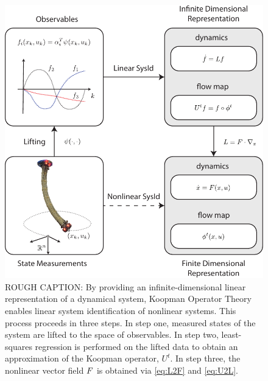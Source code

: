 \begin{figure}[t]
    \centering
    \includegraphics[width=\linewidth]{figures/overviewDiagram_v14.pdf}
    \caption{ROUGH CAPTION: 
    By providing an infinite-dimensional linear representation of a dynamical system, Koopman Operator Theory enables linear system identification of nonlinear systems. 
    This process proceeds in three steps.
    In step one, measured states of the system are lifted to the space of observables.
    In step two, least-squares regression is performed on the lifted data to obtain an approximation of the Koopman operator, $U^t$.
    In step three, the nonlinear vector field $F$ is obtained via \eqref{eq:L2F} and \eqref{eq:U2L}.}
    \label{fig:overview}
\end{figure}

